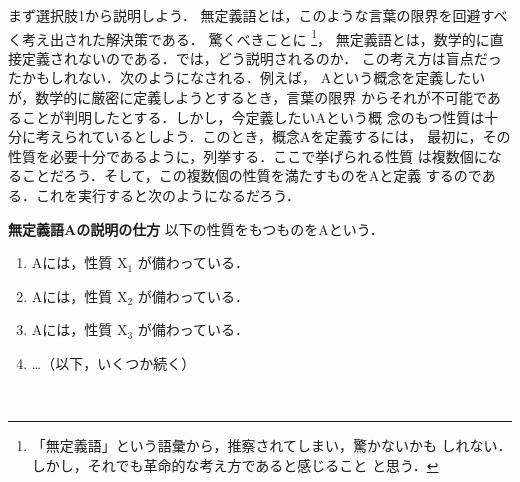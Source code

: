                 まず選択肢1から説明しよう．
                無定義語とは，このような言葉の限界を回避すべく考え出された解決策である．
                驚くべきことに
                    \footnote{
                        「無定義語」という語彙から，推察されてしまい，驚かないかも
                        しれない．しかし，それでも革命的な考え方であると感じること
                        と思う．
                    }，
                無定義語とは，数学的に直接定義されないのである．では，どう説明されるのか．
                この考え方は盲点だったかもしれない．次のようになされる．例えば，
                Aという概念を定義したいが，数学的に厳密に定義しようとするとき，言葉の限界
                からそれが不可能であることが判明したとする．しかし，今定義したいAという概
                念のもつ性質は十分に考えられているとしよう．このとき，概念Aを定義するには，
                最初に，その性質を必要十分であるように，列挙する．ここで挙げられる性質
                は複数個になることだろう．そして，この複数個の性質を満たすものをAと定義
                するのである．これを実行すると次のようになるだろう．
                    \\
                    \begin{itembox}[l]{\textbf{無定義語Aの説明の仕方}}
                        以下の性質をもつものをAという．
                        \begin{enumerate}
                            \item Aには，性質 X${}_{1}$ が備わっている．
                            \item Aには，性質 X${}_{2}$ が備わっている．
                            \item Aには，性質 X${}_{3}$ が備わっている．
                            \item …（以下，いくつか続く）
                        \end{enumerate}
                    \end{itembox}
                    \\

